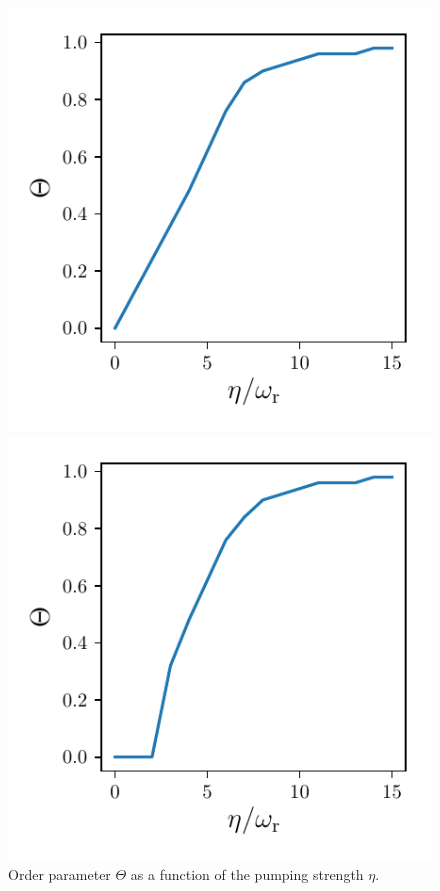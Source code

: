 \begin{figure}[!htb]
	\begin{minipage}[b]{.5\linewidth}
	\centering
	\includegraphics[width=.9\textwidth]{images/theta_long.pdf}
	\end{minipage}
%
	\begin{minipage}[b]{.5\linewidth}
	\centering
	\includegraphics[width=.9\textwidth]{images/theta_trans.pdf}
	\end{minipage}
\caption{Order parameter $\Theta$ as a function of the pumping strength $\eta$.}
\label{fig_order_param}
\end{figure}
\FloatBarrier

